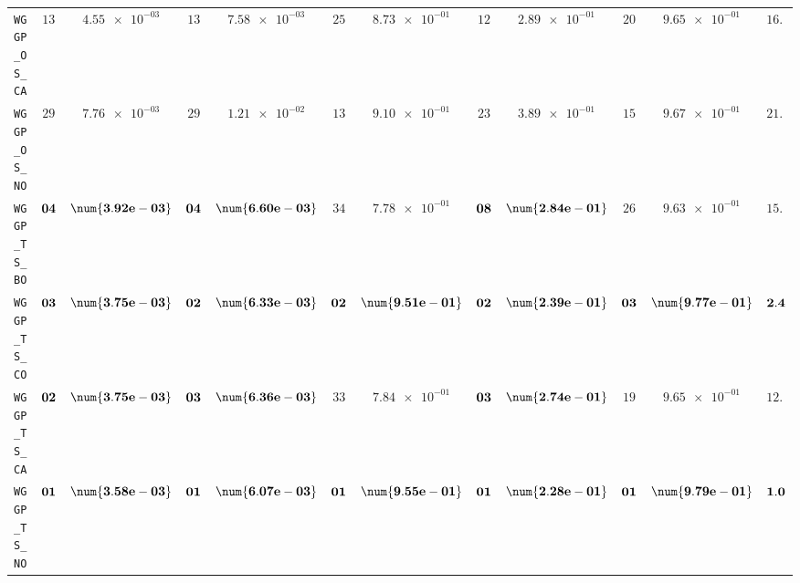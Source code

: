 \begin{table}[H]
\begin{tabularx}{\textwidth}{l||cC|cC|cC|cC|cC||c}
		\texttt{WGGP\_OS\_CA} & $ 13$ & $ \num{4.55e-03}$ & $ 13$ & $ \num{7.58e-03}$ & $ 25$ & $ \num{8.73e-01}$ & $ 12$ & $ \num{2.89e-01}$ & $ 20$ & $ \num{9.65e-01}$ & $ 16.6$  \\
		\texttt{WGGP\_OS\_NO} & $ 29$ & $ \num{7.76e-03}$ & $ 29$ & $ \num{1.21e-02}$ & $ 13$ & $ \num{9.10e-01}$ & $ 23$ & $ \num{3.89e-01}$ & $ 15$ & $ \num{9.67e-01}$ & $ 21.8$  \\
		\texttt{WGGP\_TS\_BO} & $\bf 04$ & $\bf \num{3.92e-03}$ & $\bf 04$ & $\bf \num{6.60e-03}$ & $ 34$ & $ \num{7.78e-01}$ & $\bf 08$ & $\bf \num{2.84e-01}$ & $ 26$ & $ \num{9.63e-01}$ & $ 15.2$  \\
		\texttt{WGGP\_TS\_CO} & $\bf 03$ & $\bf \num{3.75e-03}$ & $\bf 02$ & $\bf \num{6.33e-03}$ & $\bf 02$ & $\bf \num{9.51e-01}$ & $\bf 02$ & $\bf \num{2.39e-01}$ & $\bf 03$ & $\bf \num{9.77e-01}$ & $\bf 2.4$  \\
		\texttt{WGGP\_TS\_CA} & $\bf 02$ & $\bf \num{3.75e-03}$ & $\bf 03$ & $\bf \num{6.36e-03}$ & $ 33$ & $ \num{7.84e-01}$ & $\bf 03$ & $\bf \num{2.74e-01}$ & $ 19$ & $ \num{9.65e-01}$ & $ 12.0$  \\
		\texttt{WGGP\_TS\_NO} & $\bf 01$ & $\bf \num{3.58e-03}$ & $\bf 01$ & $\bf \num{6.07e-03}$ & $\bf 01$ & $\bf \num{9.55e-01}$ & $\bf 01$ & $\bf \num{2.28e-01}$ & $\bf 01$ & $\bf \num{9.79e-01}$ & $\bf 1.0$  \\
	\end{tabularx}
\end{table}
